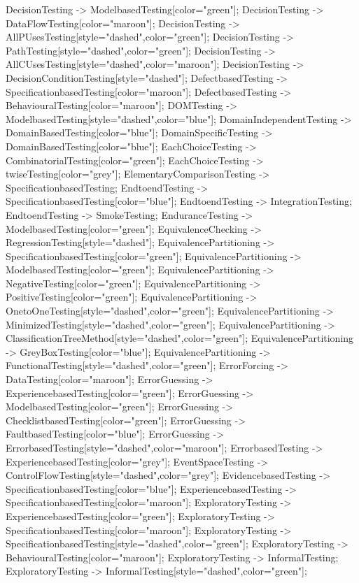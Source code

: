 \documentclass{article}
\begin{document}
{DecisionTesting -> ModelbasedTesting[color="green"];
DecisionTesting -> DataFlowTesting[color="maroon"];
DecisionTesting -> AllPUsesTesting[style="dashed",color="green"];
DecisionTesting -> PathTesting[style="dashed",color="green"];
DecisionTesting -> AllCUsesTesting[style="dashed",color="maroon"];
DecisionTesting -> DecisionConditionTesting[style="dashed"];
DefectbasedTesting -> SpecificationbasedTesting[color="maroon"];
DefectbasedTesting -> BehaviouralTesting[color="maroon"];
DOMTesting -> ModelbasedTesting[style="dashed",color="blue"];
DomainIndependentTesting -> DomainBasedTesting[color="blue"];
DomainSpecificTesting -> DomainBasedTesting[color="blue"];
EachChoiceTesting -> CombinatorialTesting[color="green"];
EachChoiceTesting -> twiseTesting[color="grey"];
ElementaryComparisonTesting -> SpecificationbasedTesting;
EndtoendTesting -> SpecificationbasedTesting[color="blue"];
EndtoendTesting -> IntegrationTesting;
EndtoendTesting -> SmokeTesting;
EnduranceTesting -> ModelbasedTesting[color="green"];
EquivalenceChecking -> RegressionTesting[style="dashed"];
EquivalencePartitioning -> SpecificationbasedTesting[color="green"];
EquivalencePartitioning -> ModelbasedTesting[color="green"];
EquivalencePartitioning -> NegativeTesting[color="green"];
EquivalencePartitioning -> PositiveTesting[color="green"];
EquivalencePartitioning -> OnetoOneTesting[style="dashed",color="green"];
EquivalencePartitioning -> MinimizedTesting[style="dashed",color="green"];
EquivalencePartitioning -> ClassificationTreeMethod[style="dashed",color="green"];
EquivalencePartitioning -> GreyBoxTesting[color="blue"];
EquivalencePartitioning -> FunctionalTesting[style="dashed",color="green"];
ErrorForcing -> DataTesting[color="maroon"];
ErrorGuessing -> ExperiencebasedTesting[color="green"];
ErrorGuessing -> ModelbasedTesting[color="green"];
ErrorGuessing -> ChecklistbasedTesting[color="green"];
ErrorGuessing -> FaultbasedTesting[color="blue"];
ErrorGuessing -> ErrorbasedTesting[style="dashed",color="maroon"];
ErrorbasedTesting -> ExperiencebasedTesting[color="grey"];
EventSpaceTesting -> ControlFlowTesting[style="dashed",color="grey"];
EvidencebasedTesting -> SpecificationbasedTesting[color="blue"];
ExperiencebasedTesting -> SpecificationbasedTesting[color="maroon"];
ExploratoryTesting -> ExperiencebasedTesting[color="green"];
ExploratoryTesting -> SpecificationbasedTesting[color="maroon"];
ExploratoryTesting -> SpecificationbasedTesting[style="dashed",color="green"];
ExploratoryTesting -> BehaviouralTesting[color="maroon"];
ExploratoryTesting -> InformalTesting;
ExploratoryTesting -> InformalTesting[style="dashed",color="green"];
}
\end{document}
